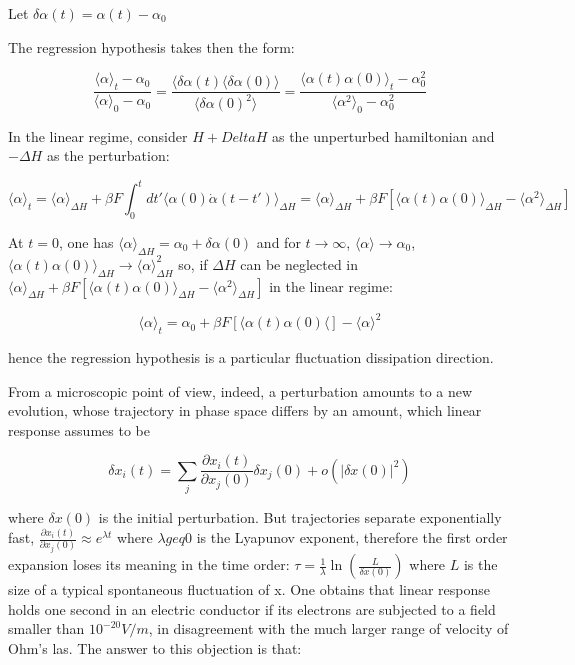 \documentclass{article}
\begin{document}
Let $\delta \alpha(t) = \alpha(t) - \alpha_0 $

The regression hypothesis takes then the form:

\begin{equation}
\frac{ \langle \alpha \rangle_t - \alpha_0 }{ \langle \alpha \rangle_0 - \alpha_0 } = \frac{ \langle \delta \alpha (t) \langle \delta \alpha (0) \rangle}{ \langle \delta \alpha(0)^2 \rangle } = \frac{ \langle \alpha(t) \alpha(0) \rangle_t - \alpha_0^2 }{ \langle \alpha^2 \rangle_0 - \alpha_0^2 }
\end{equation}

In the linear regime, consider $H + Delta H $ as the unperturbed hamiltonian and $-\Delta H$ as the perturbation:

$$ \langle \alpha \rangle_t = \langle \alpha \rangle_{\Delta H} + \beta F \int_{0}^{t} dt' \langle \alpha(0) \dot{\alpha}(t-t') \rangle_{\Delta H} =  \langle \alpha \rangle_{\Delta H} + \beta F [ \langle \alpha(t) \alpha(0) \rangle_{\Delta H} -  \langle \alpha^2 \rangle_{\Delta H} ] $$

At $t=0$, one has $\langle \alpha \rangle_{\Delta H} = \alpha_0 + \delta \alpha(0)$ and for $t \to \infty $, $\langle \alpha \rangle \to \alpha_0$, $\langle \alpha(t) \alpha(0) \rangle_{\Delta H} \to \langle \alpha \rangle^2_{\Delta H}$ so, if $\Delta H$ can be neglected in $\langle \alpha \rangle_{\Delta H} + \beta F [ \langle \alpha(t) \alpha(0) \rangle_{\Delta H} -  \langle \alpha^2 \rangle_{\Delta H} ]$ in the linear regime:

$$ \langle \alpha \rangle_t = \alpha_0 + \beta F [ \langle \alpha(t) \alpha(0) \langle ] - \langle \alpha \rangle^2 $$

hence the regression hypothesis is a particular fluctuation dissipation direction.

From a microscopic point of view, indeed, a perturbation amounts to a new evolution, whose trajectory in phase space differs by an amount, which linear response assumes to be

$$ \delta x_i(t) = \sum_{j} \frac{ \partial x_i(t)}{ \partial x_j(0)} \delta x_j(0) + o(|\delta x(0)|^2) $$

where $\delta x(0)$ is the initial perturbation. But trajectories separate exponentially fast, $ \frac{ \partial x_i(t)}{ \partial x_j(0)} \approx e^{\lambda t}$ where $\lambda geq 0$ is the Lyapunov exponent, therefore the first order expansion loses its meaning in the time order: $\tau = \frac{1}{\lambda} \ln (\frac{L}{\delta x(0)})$ where $L$ is the size of a typical spontaneous fluctuation of x. One obtains that linear response holds one second in an electric conductor if its electrons are subjected to a field smaller than $10^{-20} V/m$, in disagreement with the much larger range of velocity of Ohm's las.
The answer to this objection is that:
\end{document}
